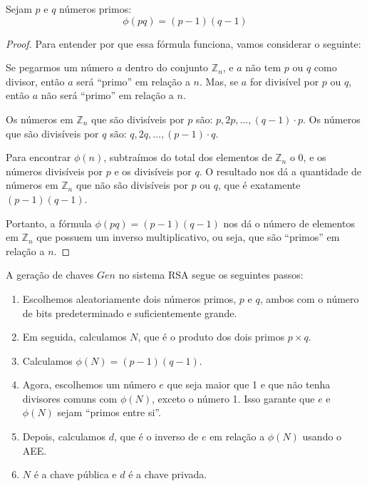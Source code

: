 \begin{proposition}
Sejam $p$ e $q$ números primos:
\begin{displaymath}
  \phi(pq) = (p - 1)(q - 1)
\end{displaymath}
\end{proposition}
\begin{proof}
Para entender por que essa fórmula funciona, vamos considerar o seguinte:

Se pegarmos um número $a$ dentro do conjunto $\mathbb{Z}_n$, e $a$ não tem $p$ ou $q$ como divisor, então $a$ será ``primo'' em relação a $n$.
Mas, se $a$ for divisível por $p$ ou $q$, então $a$ não será ``primo'' em relação a $n$.

Os números em $\mathbb{Z}_n$ que são divisíveis por $p$ são: $p, 2p, \dots, (q-1) \cdot p$.
Os números que são divisíveis por $q$ são: $q, 2q, \dots, (p-1) \cdot q$.

Para encontrar $\phi(n)$, subtraímos do total dos elementos de $\mathbb{Z}_n$ o $0$, e os números divisíveis por $p$ e os divisíveis por $q$.
O resultado nos dá a quantidade de números em $\mathbb{Z}_n$ que não são divisíveis por $p$ ou $q$, que é exatamente $(p-1)(q-1)$.

Portanto, a fórmula $\phi(pq) = (p-1)(q-1)$ nos dá o número de elementos em $\mathbb{Z}_n$ que possuem um inverso multiplicativo, ou seja, que são ``primos'' em relação a $n$.
\end{proof}

A geração de chaves $Gen$ no sistema RSA segue os seguintes passos:

\begin{enumerate}
\item Escolhemos aleatoriamente dois números primos, $p$ e $q$, ambos com o número de bits predeterminado e suficientemente grande.
    
\item Em seguida, calculamos $N$, que é o produto dos dois primos $p \times q$.
\item Calculamos $\phi(N) = (p - 1)(q - 1)$. 
    
\item Agora, escolhemos um número $e$ que seja maior que 1 e que não tenha divisores comuns com $\phi(N)$, exceto o número 1.
  Isso garante que $e$ e $\phi(N)$ sejam ``primos entre si''.
    
\item Depois, calculamos $d$, que é o inverso de $e$ em relação a $\phi(N)$ usando o AEE.
\item $N$ é a chave pública e $d$ é a chave privada.
\end{enumerate}


